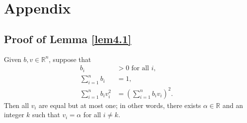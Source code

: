 \section{Appendix}\label{appendixA}

\subsection{Proof of Lemma \ref{lem4.1}}
\begin{lemma}\label{lemA.1}
    Given \( b,v \in \mathbb{R}^{n} \), suppose that
    \begin{subequations}\label{eq4.3}
        \begin{align}
            b_i & > 0 \mbox{ for all } i, \label{eq4.3a} \\
            \sum_{i=1}^n b_i & = 1, \label{eq4.3b} \\
            \sum_{i=1}^n b_i v_i^2 & = \left(\sum_{i=1}^n b_i v_i \right)^2. \label{eq4.3c}
        \end{align}
    \end{subequations}
    Then all \(v_i\) are equal but at most one; in other words, there exists \( \alpha\in\mathbb{R} \) and an integer \(k\) such that \(v_i=\alpha\) for all \(i\ne k\).
\end{lemma}
